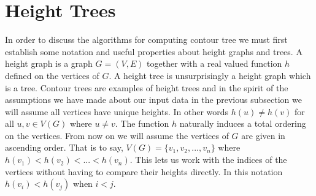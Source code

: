 



\section{Height Trees}

In order to discuss the algorithms for computing contour tree we must first establish some notation and useful properties about height graphs and trees. A height graph is a graph $G = (V, E)$ together with a real valued function $h$ defined on the vertices of $G$. A height tree is unsurprisingly a height graph which is a tree. Contour trees are examples of height trees and in the spirit of the assumptions we have made about our input data in the previous subsection we will assume all vertices have unique heights. In other words $h(u) \ne h(v)$ for all $u ,v \in V(G)$ where $u \ne v$. The function $h$ naturally induces a total ordering on the vertices. From now on we will assume the vertices of $G$ are given in ascending order. That is to say, $V(G) = \{v_1, v_2, ... , v_n\}$ where $h(v_1) < h(v_2) < ... < h(v_n)$. This lets us work with the indices of the vertices without having to compare their heights directly. In this notation $h(v_i) < h(v_j)$ when $i < j$.

